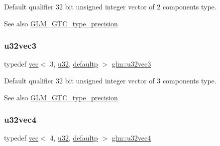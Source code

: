 Default qualifier 32 bit unsigned integer vector of 2 components type. \begin{DoxySeeAlso}{See also}
\mbox{\hyperlink{group__gtc__type__precision}{G\+L\+M\+\_\+\+G\+T\+C\+\_\+type\+\_\+precision}} 
\end{DoxySeeAlso}
\mbox{\label{group__gtc__type__precision_ga342e504c37b635393e6747b85147151f}} 
\subsubsection{\texorpdfstring{u32vec3}{u32vec3}}
{\footnotesize\ttfamily typedef \mbox{\hyperlink{structglm_1_1vec}{vec}}$<$ 3, \mbox{\hyperlink{group__gtc__type__precision_ga54e837745059fd29017bed71cfa0a8db}{u32}}, \mbox{\hyperlink{namespaceglm_a36ed105b07c7746804d7fdc7cc90ff25a9d21ccd8b5a009ec7eb7677befc3bf51}{defaultp}} $>$ \mbox{\hyperlink{group__gtc__type__precision_ga342e504c37b635393e6747b85147151f}{glm\+::u32vec3}}}

Default qualifier 32 bit unsigned integer vector of 3 components type. \begin{DoxySeeAlso}{See also}
\mbox{\hyperlink{group__gtc__type__precision}{G\+L\+M\+\_\+\+G\+T\+C\+\_\+type\+\_\+precision}} 
\end{DoxySeeAlso}
\mbox{\label{group__gtc__type__precision_gad3f72b91c5b7efbc377625c44433824d}} 
\subsubsection{\texorpdfstring{u32vec4}{u32vec4}}
{\footnotesize\ttfamily typedef \mbox{\hyperlink{structglm_1_1vec}{vec}}$<$ 4, \mbox{\hyperlink{group__gtc__type__precision_ga54e837745059fd29017bed71cfa0a8db}{u32}}, \mbox{\hyperlink{namespaceglm_a36ed105b07c7746804d7fdc7cc90ff25a9d21ccd8b5a009ec7eb7677befc3bf51}{defaultp}} $>$ \mbox{\hyperlink{group__gtc__type__precision_gad3f72b91c5b7efbc377625c44433824d}{glm\+::u32vec4}}}

